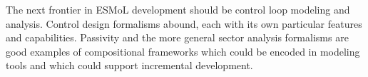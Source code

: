 The next frontier in ESMoL development should be control loop modeling and analysis.  Control design formalisms abound, each with its own particular features and capabilities.  Passivity and the more general sector analysis formalisms are good examples of compositional frameworks which could be encoded in modeling tools\cite{ncs:mic} and which could support incremental development.

